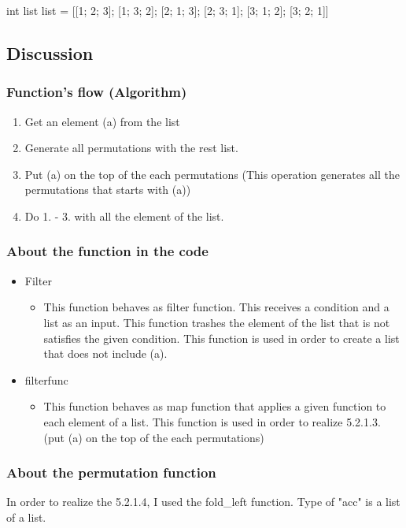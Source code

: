 \documentclass[uplatex,12pt]{jsarticle}
\begin{document}
int list list = [[1; 2; 3]; [1; 3; 2]; [2; 1; 3]; [2; 3; 1]; [3; 1; 2]; [3; 2; 1]]


\subsection{Discussion}

\subsubsection{Function's flow (Algorithm)}
\begin{enumerate}
  \item Get an element (a) from the list
  \item Generate all permutations with the rest list.
  \item Put (a) on the top of the each permutations (This operation generates all the permutations that starts with (a))
  \item Do 1. - 3. with all the element of the list.
\end{enumerate}

\subsubsection{About the function in the code}
\begin{itemize}
  \item Filter
    \begin{itemize}
      \item This function behaves as filter function. This receives a condition and a list as an input. This function trashes the element of the list that is not satisfies the given condition. This function is used in order to create a list that does not include (a).
    \end{itemize}
  \item filterfunc
    \begin{itemize}
      \item This function behaves as map function that applies a given function to each element of a list. This function is used in order to realize 5.2.1.3. (put (a) on the top of the each permutations)
    \end{itemize}
\end{itemize}

\subsubsection{About the permutation function}
In order to realize the 5.2.1.4, I used the fold\_left function. Type of "acc" is a list of a list.
\end{document}
